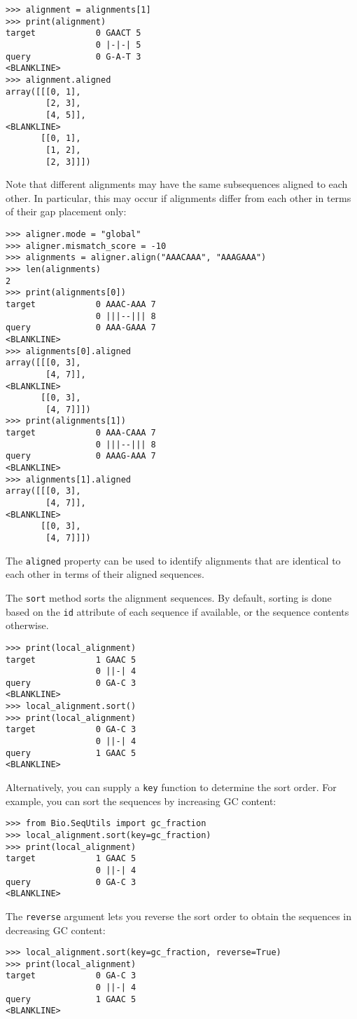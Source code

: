 \begin{verbatim}
>>> alignment = alignments[1]
>>> print(alignment)
target            0 GAACT 5
                  0 |-|-| 5
query             0 G-A-T 3
<BLANKLINE>
>>> alignment.aligned
array([[[0, 1],
        [2, 3],
        [4, 5]],
<BLANKLINE>
       [[0, 1],
        [1, 2],
        [2, 3]]])
\end{verbatim}
Note that different alignments may have the same subsequences aligned to each other. In particular, this may occur if alignments differ from each other in terms of their gap placement only:

\begin{verbatim}
>>> aligner.mode = "global"
>>> aligner.mismatch_score = -10
>>> alignments = aligner.align("AAACAAA", "AAAGAAA")
>>> len(alignments)
2
>>> print(alignments[0])
target            0 AAAC-AAA 7
                  0 |||--||| 8
query             0 AAA-GAAA 7
<BLANKLINE>
>>> alignments[0].aligned
array([[[0, 3],
        [4, 7]],
<BLANKLINE>
       [[0, 3],
        [4, 7]]])
>>> print(alignments[1])
target            0 AAA-CAAA 7
                  0 |||--||| 8
query             0 AAAG-AAA 7
<BLANKLINE>
>>> alignments[1].aligned
array([[[0, 3],
        [4, 7]],
<BLANKLINE>
       [[0, 3],
        [4, 7]]])
\end{verbatim}
The \verb+aligned+ property can be used to identify alignments that are identical to each other in terms of their aligned sequences.

The \verb+sort+ method sorts the alignment sequences. By default, sorting is done based on the \verb+id+ attribute of each sequence if available, or the sequence contents otherwise.
\begin{verbatim}
>>> print(local_alignment)
target            1 GAAC 5
                  0 ||-| 4
query             0 GA-C 3
<BLANKLINE>
>>> local_alignment.sort()
>>> print(local_alignment)
target            0 GA-C 3
                  0 ||-| 4
query             1 GAAC 5
<BLANKLINE>
\end{verbatim}
Alternatively, you can supply a \verb+key+ function to determine the sort order. For example, you can sort the sequences by increasing GC content:
\begin{verbatim}
>>> from Bio.SeqUtils import gc_fraction
>>> local_alignment.sort(key=gc_fraction)
>>> print(local_alignment)
target            1 GAAC 5
                  0 ||-| 4
query             0 GA-C 3
<BLANKLINE>
\end{verbatim}
The \verb+reverse+ argument lets you reverse the sort order to obtain the sequences in decreasing GC content:
\begin{verbatim}
>>> local_alignment.sort(key=gc_fraction, reverse=True)
>>> print(local_alignment)
target            0 GA-C 3
                  0 ||-| 4
query             1 GAAC 5
<BLANKLINE>
\end{verbatim}

